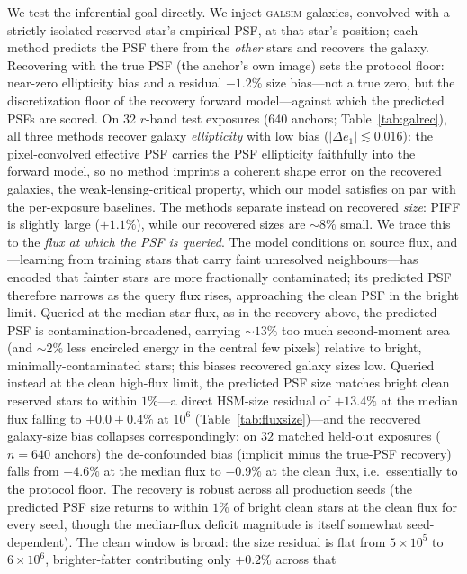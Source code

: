 \documentclass[twocolumn]{aastex701}
\begin{document}
We test the inferential goal directly. We inject \textsc{galsim} galaxies, convolved with
a strictly isolated reserved star's empirical PSF, at that star's position; each method
predicts the PSF there from the \emph{other} stars and recovers the galaxy. Recovering
with the true PSF (the anchor's own image) sets the protocol floor: near-zero ellipticity
bias and a residual $-1.2\%$ size bias---not a true zero, but the discretization floor of
the recovery forward model---against which the predicted PSFs are scored.
On 32 $r$-band test exposures (640 anchors; Table~\ref{tab:galrec}), all three methods recover galaxy
\emph{ellipticity} with low bias ($|\Delta e_1|\lesssim0.016$): the pixel-convolved
effective PSF carries the PSF ellipticity faithfully into the forward model, so no method
imprints a coherent shape error on the recovered galaxies, the weak-lensing-critical
property, which our model satisfies on par with the per-exposure baselines. The methods
separate instead on recovered \emph{size}: \textsc{PIFF} is slightly large ($+1.1\%$),
while our recovered sizes are ${\sim}8\%$ small. We trace this to the \emph{flux at which
the PSF is queried}. The model conditions on source flux, and---learning from training
stars that carry faint unresolved neighbours---has encoded that fainter stars are more
fractionally contaminated; its predicted PSF therefore narrows as the query flux rises,
approaching the clean PSF in the bright limit. Queried at the median star flux, as in the
recovery above, the predicted PSF is contamination-broadened, carrying ${\sim}13\%$ too
much second-moment area (and ${\sim}2\%$ less encircled energy in the central few pixels)
relative to bright, minimally-contaminated stars; this biases recovered galaxy sizes low.
Queried instead at the clean high-flux limit, the predicted PSF size matches bright clean
reserved stars to within $1\%$---a direct HSM-size residual of $+13.4\%$ at the median flux
falling to $+0.0\pm0.4\%$ at $10^6$ (Table~\ref{tab:fluxsize})---and the recovered
galaxy-size bias collapses correspondingly: on $32$ matched held-out exposures
($n=640$ anchors) the de-confounded bias (implicit minus the true-PSF recovery) falls from
$-4.6\%$ at the median flux to $-0.9\%$ at the clean flux, i.e.\ essentially to the protocol
floor. The recovery is robust across all production seeds (the predicted PSF size returns to
within $1\%$ of bright clean stars at the clean flux for every seed, though the median-flux
deficit magnitude is itself somewhat seed-dependent). The clean
window is broad: the size residual is flat
from $5\times10^5$ to $6\times10^6$, brighter-fatter contributing only $+0.2\%$ across that
\end{document}
